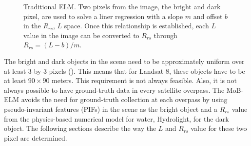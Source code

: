 \documentclass[onecolumn,3p,letterpaper]{elsarticle}
\begin{document}
\begin{figure}[htb]
	\centering
\caption{Traditional ELM. Two pixels from the image, the bright and dark pixel, are used to solve a liner regression with a slope $m$ and offset $b$ in the $R_{rs}$, $L$ space. Once this relationship is established, each $L$ value in the image can be converted to $R_{rs}$ through $R_{rs}=(L-b)/m$. \label{fig:ELMregression}}
\end{figure}

The bright and dark objects in the scene need to be approximately uniform over at least 3-by-3 pixels (\cite{Schott}). This means that for Landsat 8, these objects have to be at least $90\times 90$ meters. This requirement is not always feasible. Also, it is not always possible to have ground-truth data in every satellite overpass. The MoB-ELM avoids the need for ground-truth collection at each overpass by using pseudo-invariant features (PIFs) in the scene as the bright object and a $R_{rs}$ value from the physics-based numerical model for water, Hydrolight, for the dark object. The following sections describe the way the $L$ and $R_{rs}$ value for these two pixel are determined.
\end{document}
